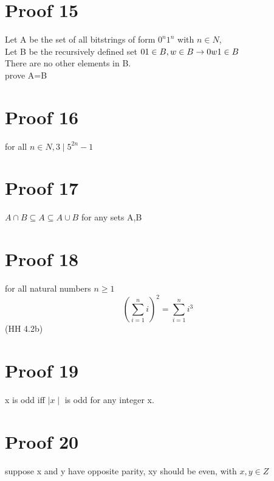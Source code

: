 \documentclass{article}
\begin{document}
\section{Proof 15}
Let A be the set of all bitstrings of form $0^n1^n$ with $n \in N$, \\
Let B be the recursively defined set $01 \in B, \\w \in B \rightarrow 0w1 \in B$\\ There are no other elements in B.\\ prove A=B\\


\section{Proof 16}
for all $n \in N, 3 \mid 5^{2n}-1$\\


\section{Proof 17}
$A \cap B \subseteq A \subseteq A \cup B$ for any sets A,B\\


\section{Proof 18}
for all natural numbers $n\geq1$ $$(\sum^{n}_{i=1}i)^2 = \sum^{n}_{i=1}i^3$$ (HH 4.2b)\\

\section{Proof 19}
x is odd iff $\mid x\mid$ is odd for any integer x.\\

\section{Proof 20}
suppose x and y have opposite parity, xy should be even, with $x,y \in Z$\\


 
\end{document}
